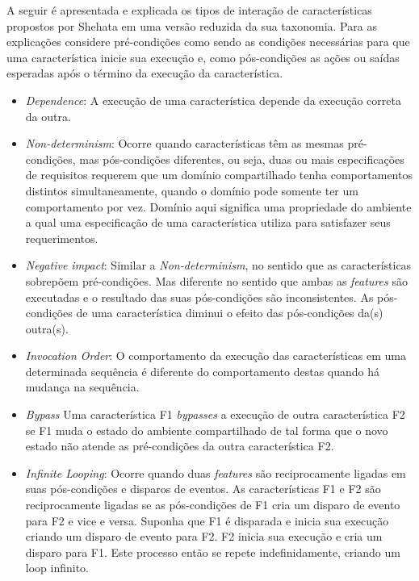 A seguir é apresentada e explicada os tipos de interação de características propostos por Shehata em uma versão reduzida da sua taxonomia\cite{NHLABATSI:2008}. Para as explicações considere pré-condições como sendo as condições necessárias para que uma característica inicie sua execução e, como pós-condições as ações ou saídas esperadas após o término da execução da característica.

\begin{itemize}
\item \textit{Dependence}: A execução de uma característica depende da execução correta da outra.
\item \textit{Non-determinism}: Ocorre quando características têm as mesmas pré-condições, mas pós-condições diferentes, ou seja, duas ou mais especificações de requisitos requerem que um domínio compartilhado tenha comportamentos distintos simultaneamente, quando o domínio pode somente ter um comportamento por vez. Domínio aqui significa uma propriedade do ambiente a qual uma especificação de uma característica utiliza para satisfazer seus requerimentos. 
\item \textit{Negative impact}: Similar a \textit{Non-determinism}, no sentido que as características sobrepõem pré-condições. Mas diferente no sentido que ambas as \textit{features} são executadas e o resultado das suas pós-condições são inconsistentes. As pós-condições de uma característica diminui o efeito das pós-condições da(s) outra(s).
\item \textit{Invocation Order}: O comportamento da execução das características em uma determinada sequência é diferente do comportamento destas quando há mudança na sequência.
\item \textit{Bypass} Uma característica F1 \textit{bypasses} a execução de outra característica F2 se F1 muda o estado do ambiente compartilhado de tal forma que o novo estado não atende as pré-condições da outra característica F2.
\item \textit{Infinite Looping}: Ocorre quando duas \textit{features} são reciprocamente ligadas em suas pós-condições e disparos de eventos. As características F1 e F2 são reciprocamente ligadas se as pós-condições de F1 cria um disparo de evento para F2 e vice e versa. Suponha que F1 é disparada e inicia sua execução criando um disparo de evento para F2. F2 inicia sua execução e cria um disparo para F1. Este processo então se repete indefinidamente, criando um loop infinito.  
\end{itemize}

